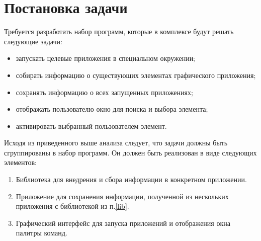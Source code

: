 \section{Постановка задачи}

Требуется разработать набор программ, которые в комплексе будут решать следующие
задачи:

\begin{itemize}
	\item запускать целевые приложения в специальном окружении;
	\item собирать информацию о существующих элементах графического приложения;
	\item сохранять информацию о всех запущенных приложениях;
	\item отображать пользователю окно для поиска и выбора элемента;
	\item активировать выбранный пользователем элемент.
\end{itemize}

Исходя из приведенного выше анализа следует, что задачи должны быть сгруппированы
в набор программ. Он должен быть реализован в виде следующих элементов:

\begin{enumerate}
	\item\label{lib} Библиотека для внедрения и сбора информации в конкретном
		приложении.
	\item Приложение для сохранения информации, полученной из нескольких
		приложения с библиотекой из п.\ref{lib}.
	\item Графический интерфейс для запуска приложений и отображения окна
		палитры команд.
\end{enumerate}


